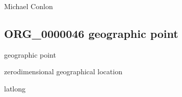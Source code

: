 \documentclass[letterpaper,10pt,english]{sphinxmanual}
\begin{document}
\begin{sphinxShadowBox}

\sphinxAtStartPar
{}
\end{sphinxShadowBox}

\begin{sphinxShadowBox}

\sphinxAtStartPar
Michael Conlon 
\end{sphinxShadowBox}

\begin{sphinxShadowBox}

\sphinxAtStartPar
{}
\end{sphinxShadowBox}
\begin{quote}

\ignorespaces \end{quote}


\subsection{ORG\_0000046 \sphinxhyphen{} geographic point}
\label{\detokenize{doc-ORG_0000046:org-0000046-geographic-point}}\label{\detokenize{doc-ORG_0000046:index-0}}\label{\detokenize{doc-ORG_0000046::doc}}
\begin{sphinxShadowBox}

\sphinxAtStartPar
geographic point
\end{sphinxShadowBox}

\begin{sphinxShadowBox}

\sphinxAtStartPar
zero\sphinxhyphen{}dimensional geographical location
\end{sphinxShadowBox}

\begin{sphinxShadowBox}

\sphinxAtStartPar
latlong
\end{sphinxShadowBox}

\begin{sphinxShadowBox}

\sphinxAtStartPar
{\hyperref[\detokenize{doc-ORG_0000045::doc}]{}}
\end{sphinxShadowBox}
\end{document}
